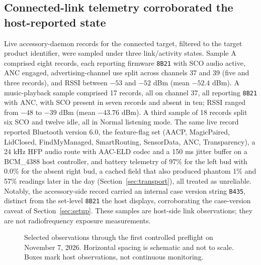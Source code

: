 \documentclass[11pt,letterpaper]{article}
\begin{document}
\subsection{Connected-link telemetry corroborated the host-reported state}
Live accessory-daemon records for the connected target, filtered to the target product identifier, were sampled under three link/activity states. Sample A comprised eight records, each reporting firmware \texttt{8B21} with SCO audio active, ANC engaged, advertising-channel use split across channels 37 and 39 (five and three records), and RSSI between $-53$ and $-52$ dBm (mean $-52.4$ dBm). A music-playback sample comprised 17 records, all on channel 37, all reporting \texttt{8B21} with ANC, with SCO present in seven records and absent in ten; RSSI ranged from $-48$ to $-39$ dBm (mean $-43.76$ dBm). A third sample of 18 records split six SCO and twelve idle, all in Normal listening mode. The same live record reported Bluetooth version 6.0, the feature-flag set (AACP, MagicPaired, LidClosed, FindMyManaged, SmartRouting, SensorData, ANC, Transparency), a 24 kHz HFP audio route with AAC-ELD codec and a 150 ms jitter buffer on a BCM\_4388 host controller, and battery telemetry of 97\% for the left bud with 0.0\% for the absent right bud, a cached field that also produced phantom 1\% and 57\% readings later in the day (Section~\ref{sec:transport}), all treated as unreliable. Notably, the accessory-side record carried an internal case version string \texttt{B435}, distinct from the set-level \texttt{8B21} the host displays, corroborating the case-version caveat of Section~\ref{sec:setup}. These samples are host-side link observations; they are not radiofrequency exposure measurements.

\begin{figure}[htbp]\centering
{}
\caption{Selected observations through the first controlled preflight on November 7, 2026. Horizontal spacing is schematic and not to scale. Boxes mark host observations, not continuous monitoring.}\label{fig:timeline}
\end{figure}
\end{document}
